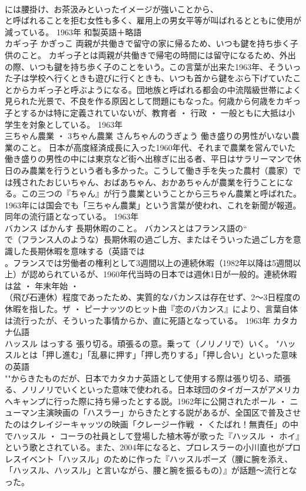\documentclass[8pt]{extreport}
\begin{document}
\begin{CJK}{UTF8}{min}
\\	には腰掛け、お茶汲みといったイメージが強いことから、
\\	と呼ばれることを拒む女性も多く、雇用上の男女平等が叫ばれるとともに使用が減っている。	1963年	和製英語＋略語	
\\	カギっ子	かぎっこ	両親が共働きで留守の家に帰るため、いつも鍵を持ち歩く子供のこと。	カギっ子とは両親が共働きで帰宅の時間には留守になるため、外出の際、いつも鍵を持ち歩く子のことをいう。この言葉が出来た1963年、そういった子は学校へ行くときも遊びに行くときも、いつも首から鍵をぶら下げていたことからカギっ子と呼ぶようになる。団地族と呼ばれる都会の中流階級世帯によく見られた光景で、不良を作る原因として問題にもなった。何歳から何歳をカギっ子とするかは特に定義されていないが、教育者 ・ 行政 ・ 一般ともに大抵は小学生を対象としている。	1963年	
\\	三ちゃん農業 ・ 3ちゃん農業	さんちゃんのうぎょう	働き盛りの男性がいない農業のこと。	日本が高度経済成長に入った1960年代、それまで農業を営んでいた働き盛りの男性の中には東京など街へ出稼ぎに出る者、平日はサラリーマンで休日のみ農業を行うという者も多かった。こうして働き手を失った農村（農家）では残されたおじいちゃん、おばあちゃん、おかあちゃんが農業を行うことになる。この三つの『ちゃん』が行う農業ということから三ちゃん農業と呼ばれた。 1963年には国会でも「三ちゃん農業」という言葉が使われ、これを新聞が報道。同年の流行語となっている。	1963年	
\\	バカンス	ばかんす	長期休暇のこと。	バカンスとはフランス語の“
\\	で（フランス人のような）長期休暇の過ごし方、またはそういった過ごし方を意識した長期休暇を意味する（英語では
\\	。フランスでは労働者の権利として3週間以上の連続休暇（1982年以降は5週間以上）が認められているが、1960年代当時の日本では週休1日が一般的。連続休暇は盆 ・ 年末年始 ・ 
\\	（飛び石連休）程度であったため、実質的なバカンスは存在せず、2～3日程度の休暇を指した。ザ ・ ピーナッツのヒット曲『恋のバカンス』により、言葉自体は流行ったが、そういった事情からか、直に死語となっている。	1963年	カタカナ仏語	
\\	ハッスル	はっする	張り切る。頑張るの意。乗って（ノリノリで）いく。	"ハッスルとは「押し進む」「乱暴に押す」「押し売りする」「押し合い」といった意味の英語
\\	""からきたものだが、日本でカタカナ英語として使用する際は張り切る、頑張る、ノリノリでいくといった意味で使われる。日本球団のタイガースがアメリカへキャンプに行った際に持ち帰ったとする説。1962年に公開されたポール ・ ニューマン主演映画の「ハスラー」からきたとする説があるが、全国区で普及させたのはクレイジーキャッツの映画「クレージー作戦 ・ くたばれ！無責任」の中でハッスル ・ コーラの社員として登場した植木等が歌った『ハッスル ・ ホイ』という歌とされている。また、2004年になると、プロレスラーの小川直也がプロレスイベント「ハッスル」のために作った『ハッスルポーズ（腰に腕を添え、「ハッスル、ハッスル」と言いながら、腰と腕を振るもの）』が話題～流行となった。

\end{CJK}
\end{document}
